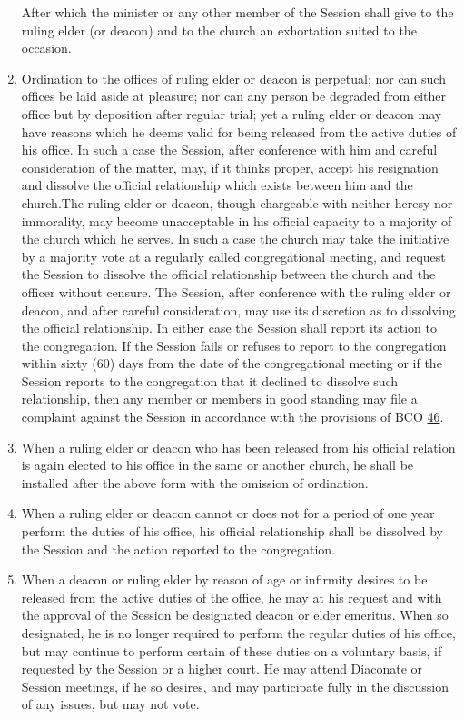 \documentclass[
]{book}
\begin{document}
\begin{enumerate}
  After which the minister or any other member of the Session shall give to the ruling elder (or deacon) and to the church an exhortation suited to the occasion.
\item
  \protect\hypertarget{26.5}{\href{}{}}Ordination to the offices of ruling elder or deacon is perpetual; nor can such offices be laid aside at pleasure; nor can any person be degraded from either office but by deposition after regular trial; yet a ruling elder or deacon may have reasons which he deems valid for being released from the active duties of his office. In such a case the Session, after conference with him and careful consideration of the matter, may, if it thinks proper, accept his resignation and dissolve the official relationship which exists between him and the church.The ruling elder or deacon, though chargeable with neither heresy nor immorality, may become unacceptable in his official capacity to a majority of the church which he serves. In such a case the church may take the initiative by a majority vote at a regularly called congregational meeting, and request the Session to dissolve the official relationship between the church and the officer without censure. The Session, after conference with the ruling elder or deacon, and after careful consideration, may use its discretion as to dissolving the official relationship. In either case the Session shall report its action to the congregation. If the Session fails or refuses to report to the congregation within sixty (60) days from the date of the congregational meeting or if the Session reports to the congregation that it declined to dissolve such relationship, then any member or members in good standing may file a complaint against the Session in accordance with the provisions of BCO \protect\hyperlink{46}{46}.
\item
  When a ruling elder or deacon who has been released from his official relation is again elected to his office in the same or another church, he shall be installed after the above form with the omission of ordination.
\item
  When a ruling elder or deacon cannot or does not for a period of one year perform the duties of his office, his official relationship shall be dissolved by the Session and the action reported to the congregation.
\item
  When a deacon or ruling elder by reason of age or infirmity desires to be released from the active duties of the office, he may at his request and with the approval of the Session be designated deacon or elder emeritus. When so designated, he is no longer required to perform the regular duties of his office, but may continue to perform certain of these duties on a voluntary basis, if requested by the Session or a higher court. He may attend Diaconate or Session meetings, if he so desires, and may participate fully in the discussion of any issues, but may not vote.
\end{enumerate}
\end{document}
